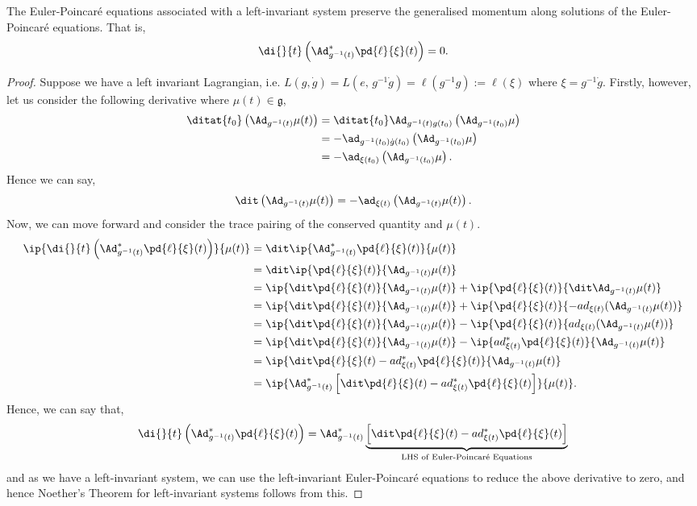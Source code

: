 \begin{nthm}\label{thm:NTLR}
  The Euler-Poincar\'e equations associated with a left-invariant system preserve the generalised momentum along solutions of the Euler-Poincar\'e equations. That is,
  $$ \di{}{t} \left(\Ad^*_{g^{-1}(t)}\pd{\ell}{\xi}(t)\right) = 0. $$
\end{nthm}
\begin{proof}
  Suppose we have a left invariant Lagrangian, i.e. $L(g, \dot g) = L(e,\,g^{-1}\dot g) = \ell(g^{-1}g) := \ell(\xi)$ where $\xi = g^{-1}\dot g$. Firstly, however, let us consider the following derivative where $\mu(t) \in \mathfrak{g}$,
  \begin{align*}
    \ditat{t_0}\left( \Ad_{g^{-1}(t)}\mu(t) \right) &= \ditat{t_0} \Ad_{g^{-1}(t)g(t_0)}\left( \Ad_{g^{-1}(t_0)} \mu\right)\\
    &= -\ad_{g^{-1}(t_0)\dot g(t_0)} \left( \Ad_{g^{-1}(t_0)} \mu\right)\\
    &= -\ad_{\xi(t_0)} \left( \Ad_{g^{-1}(t_0)} \mu\right).
  \end{align*}
  Hence we can say,
  $$ \dit\left( \Ad_{g^{-1}(t)}\mu(t) \right) = -\ad_{\xi(t)} \left( \Ad_{g^{-1}(t)} \mu(t)\right). $$
  Now, we can move forward and consider the trace pairing of the conserved quantity and $\mu(t)$.
  \begin{align*}
    \ip{ \di{}{t} \left(\Ad^*_{g^{-1}(t)}\pd{\ell}{\xi}(t)\right) }{ \mu(t) } &= \dit \ip{ \Ad^*_{g^{-1}(t)}\pd{\ell}{\xi}(t) }{ \mu(t) } \\
    &= \dit \ip{ \pd{\ell}{\xi}(t) }{ \Ad_{g^{-1}(t)}\mu(t) } \\
    &=  \ip{ \dit\pd{\ell}{\xi}(t) }{ \Ad_{g^{-1}(t)}\mu(t) } + \ip{ \pd{\ell}{\xi}(t) }{ \dit\Ad_{g^{-1}(t)}\mu(t) } \\
    &=  \ip{ \dit\pd{\ell}{\xi}(t) }{ \Ad_{g^{-1}(t)}\mu(t) } + \ip{ \pd{\ell}{\xi}(t) }{ -ad_{\xi(t)}(\Ad_{g^{-1}(t)}\mu(t)) } \\
    &=  \ip{ \dit\pd{\ell}{\xi}(t) }{ \Ad_{g^{-1}(t)}\mu(t) } - \ip{ \pd{\ell}{\xi}(t) }{ ad_{\xi(t)}(\Ad_{g^{-1}(t)}\mu(t)) } \\
    &=  \ip{ \dit\pd{\ell}{\xi}(t) }{ \Ad_{g^{-1}(t)}\mu(t) } - \ip{ ad^*_{\xi(t)}\pd{\ell}{\xi}(t) }{ \Ad_{g^{-1}(t)}\mu(t) } \\
    &=  \ip{ \dit\pd{\ell}{\xi}(t) - ad^*_{\xi(t)}\pd{\ell}{\xi}(t) }{ \Ad_{g^{-1}(t)}\mu(t) } \\
    &=  \ip{ \Ad^*_{g^{-1}(t)}\left[\dit\pd{\ell}{\xi}(t) - ad^*_{\xi(t)}\pd{\ell}{\xi}(t)\right] }{ \mu(t) }.
  \end{align*}
  Hence, we can say that,
  $$ \di{}{t} \left(\Ad^*_{g^{-1}(t)}\pd{\ell}{\xi}(t)\right) = \Ad^*_{g^{-1}(t)}\underbrace{\left[\dit\pd{\ell}{\xi}(t) - ad^*_{\xi(t)}\pd{\ell}{\xi}(t)\right]}_{\text{LHS of Euler-Poincar\'e Equations}}  $$
  and as we have a left-invariant system, we can use the left-invariant Euler-Poincar\'e equations to reduce the above derivative to zero, and hence Noether's Theorem for left-invariant systems follows from this.
\end{proof}

